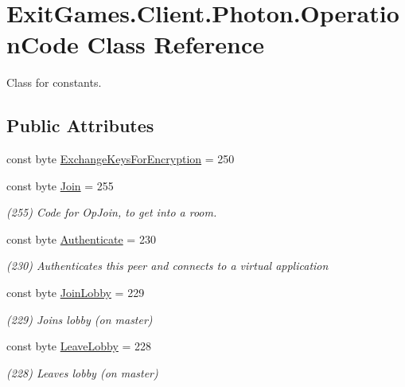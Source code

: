 \hypertarget{class_exit_games_1_1_client_1_1_photon_1_1_operation_code}{}\section{Exit\+Games.\+Client.\+Photon.\+Operation\+Code Class Reference}
\label{class_exit_games_1_1_client_1_1_photon_1_1_operation_code}


Class for constants.  


\subsection*{Public Attributes}
\begin{DoxyCompactItemize}
\item 
const byte \hyperlink{class_exit_games_1_1_client_1_1_photon_1_1_operation_code_afa955a532c6293b315db995fc1cadd4a}{Exchange\+Keys\+For\+Encryption} = 250
\item 
const byte \hyperlink{class_exit_games_1_1_client_1_1_photon_1_1_operation_code_ab40167d42ef70df40f89864db5085c68}{Join} = 255
\begin{DoxyCompactList}\small\item\em (255) Code for Op\+Join, to get into a room.\end{DoxyCompactList}\item 
const byte \hyperlink{class_exit_games_1_1_client_1_1_photon_1_1_operation_code_a593c0164845113e55d36c4ab792620b9}{Authenticate} = 230
\begin{DoxyCompactList}\small\item\em (230) Authenticates this peer and connects to a virtual application\end{DoxyCompactList}\item 
const byte \hyperlink{class_exit_games_1_1_client_1_1_photon_1_1_operation_code_a160904b6b125f48aeee0a33f7745aa6b}{Join\+Lobby} = 229
\begin{DoxyCompactList}\small\item\em (229) Joins lobby (on master)\end{DoxyCompactList}\item 
const byte \hyperlink{class_exit_games_1_1_client_1_1_photon_1_1_operation_code_ac9483ca214470e195bd3b4558aee3a08}{Leave\+Lobby} = 228
\begin{DoxyCompactList}\small\item\em (228) Leaves lobby (on master)\end{DoxyCompactList}\item 

\end{DoxyCompactItemize}
